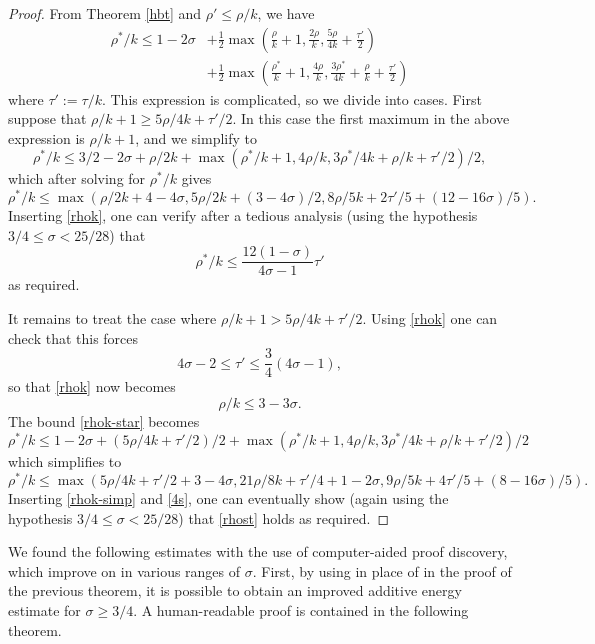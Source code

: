 \begin{proof}
From Theorem \ref{hbt} and $\rho' \le \rho/k$, we have
\begin{equation}\label{rhok-star}
\begin{split}
\rho^*/k \leq 1-2\sigma &+ \frac{1}{2}\max\left(\frac{\rho}{k}+1, \frac{2\rho}{k}, \frac{5\rho}{4k} + \frac{\tau'}{2}\right)\\
&+ \frac{1}{2}\max\left(\frac{\rho^*}{k}+1, \frac{4\rho}{k}, \frac{3\rho^*}{4k}+\frac{\rho}{k}+\frac{\tau'}{2}\right)
\end{split}
\end{equation}
where $\tau' := \tau/k$.  This expression is complicated, so we divide into cases.
First suppose that $\rho/k+1 \geq 5\rho/4k + \tau'/2$.  In this case the first maximum in the above expression is $\rho/k+1$, and we simplify to
$$ \rho^*/k \leq 3/2-2\sigma + \rho/2k + \max(\rho^*/k+1, 4\rho/k, 3\rho^*/4k+\rho/k+\tau'/2)/2,$$
which after solving for $\rho^*/k$ gives
$$ \rho^*/k \leq \max( \rho/2k + 4-4\sigma, 5\rho/2k + (3-4\sigma)/2, 8\rho/5k + 2\tau'/5 + (12-16\sigma)/5).$$
Inserting \eqref{rhok}, one can verify after a tedious analysis (using the hypothesis $3/4 \leq \sigma < 25/28$) that
\begin{equation}\label{rhost}
    \rho^*/k \leq \frac{12(1-\sigma)}{4\sigma-1} \tau'
\end{equation}
as required.

It remains to treat the case where $\rho/k+1 > 5\rho/4k + \tau'/2$.  Using \eqref{rhok} one can check that this forces
\begin{equation}\label{4s}
    4\sigma-2 \leq \tau' \leq \frac{3}{4}(4\sigma-1),
\end{equation}
so that \eqref{rhok} now becomes
\begin{equation}\label{rhok-simp}
\rho/k \leq 3-3\sigma.
\end{equation}
The bound \eqref{rhok-star} becomes
$$\rho^*/k \leq 1-2\sigma + (5\rho/4k+\tau'/2)/2 + \max(\rho^*/k+1, 4\rho/k, 3\rho^*/4k+\rho/k+\tau'/2)/2$$
which simplifies to
$$ \rho^*/k \leq \max( 5\rho/4k + \tau'/2 + 3-4\sigma, 21\rho/8k + \tau'/4 + 1-2\sigma, 9\rho/5k + 4\tau'/5 + (8 - 16\sigma)/5).$$
Inserting \eqref{rhok-simp} and \eqref{4s}, one can eventually show (again using the hypothesis $3/4 \leq \sigma < 25/28$) that
\eqref{rhost} holds as required.
\end{proof}

We found the following estimates with the use of computer-aided proof discovery, which improve on  in various ranges of $\sigma$. First, by using  in place of  in the proof of the previous theorem, it is possible to obtain an improved additive energy estimate for $\sigma \ge 3/4$. A human-readable proof is contained in the following theorem.

